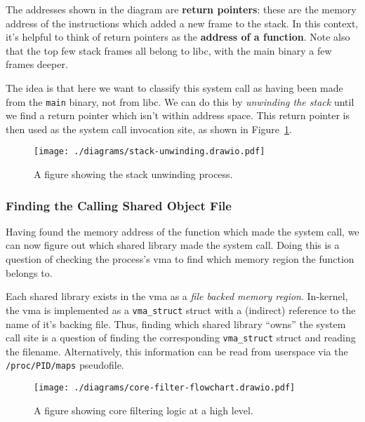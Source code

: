 The addresses shown in the diagram are \textbf{return pointers}: these are the
memory address of the instructions which added a new frame to the stack. In this
context, it's helpful to think of return pointers as the \textbf{address of a
function}. Note also that the top few stack frames all belong to \ac{libc}, with
the main binary a few frames deeper.

The idea is that here we want to classify this system call as having been made from
the \texttt{main} binary, not from \ac{libc}. We can do this by
\textit{unwinding the stack} until we find a return pointer which isn't within
 address space. This return pointer is then used as the system call
invocation site, as shown in Figure~\ref{fig:stack-unwinding}.

\begin{figure}[ht]
    \centering
    \texttt{[image: ./diagrams/stack-unwinding.drawio.pdf]} 
    \caption{A figure showing the stack unwinding process.}
    \label{fig:stack-unwinding}
\end{figure}

\subsubsection{Finding the Calling Shared Object File}\label{subsubsec:find_so}

Having found the memory address of the function which made the system call, we
can now figure out which shared library made the system call. Doing this is a
question of checking the process's \ac{vma} to find which memory region the
function belongs to. 

Each shared library exists in the \ac{vma} as a \textit{file backed memory region}.
In-kernel, the \ac{vma} is implemented as a \texttt{vma\_struct} struct with a
(indirect) reference to the name of it's backing file. Thus, finding which
shared library ``owns'' the system call site is a question of finding the
corresponding \texttt{vma\_struct} struct and reading the filename.
Alternatively, this information can be read from userspace via the
\texttt{/proc/PID/maps} pseudofile.

\begin{figure}[h]
    \centering
    \texttt{[image: ./diagrams/core-filter-flowchart.drawio.pdf]}
    \caption{A figure showing \afg core filtering logic at a high level.}
    \label{fig:core-filter-flowchart}
\end{figure}

